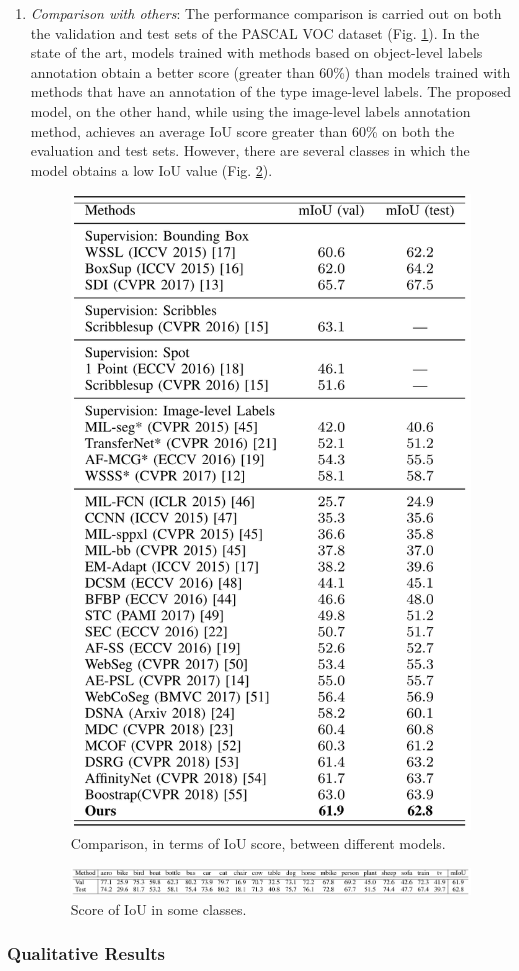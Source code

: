 \begin{enumerate}
    \item \emph{Comparison with others}: The performance comparison is carried out on both the validation and test sets of the PASCAL VOC dataset (Fig. \ref{fig:IoU score comparison}). In the state of the art, models trained with methods based on object-level labels annotation obtain a better score (greater than 60\%) than models trained with methods that have an annotation of the type image-level labels. The proposed model, on the other hand, while using the image-level labels annotation method, achieves an average IoU score greater than 60\% on both the evaluation and test sets. However, there are several classes in which the model obtains a low IoU value (Fig. \ref{fig:classes}).
    \begin{figure}[h!]
        \centering
        \includegraphics[width = 0.6 \linewidth]{images/paper6/comparison.png}
        \centering
        \caption{Comparison, in terms of IoU score, between different models.}
        \label{fig:IoU score comparison}
    \end{figure}
    \begin{figure}[h!]
        \centering
        \includegraphics[width = 1 \linewidth]{images/paper6/classes.png}
        \centering
        \caption{Score of IoU in some classes.}
        \label{fig:classes}
    \end{figure}
\end{enumerate}

\subsubsection{Qualitative Results}


